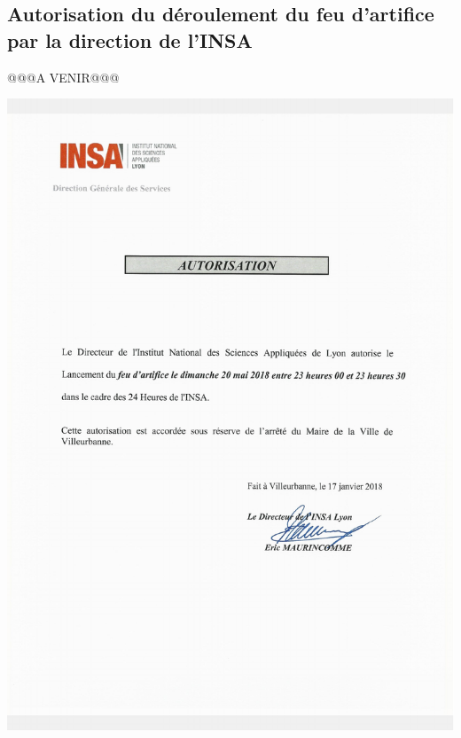 \documentclass[hidelinks, paper=a4, fontsize=13pt]{report}
\begin{document}
\subsection{Autorisation du déroulement du feu d’artifice par la direction de l’INSA}
@@@A VENIR@@@
\begin{center}
\includegraphics[scale=0.7]{Annexes/Documents/INSAAutorisationFeuArtifice}
\end{center}
\end{document}

